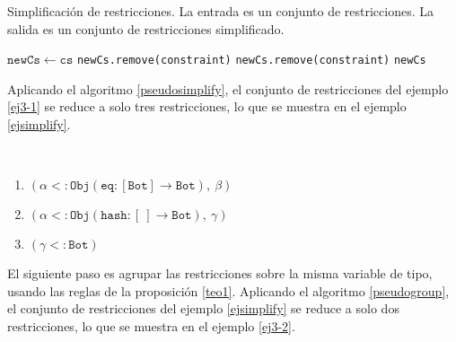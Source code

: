 \begin{algorithm}\captionsetup{labelsep=newline}
  \centering
  \caption{Simplificación de restricciones. La entrada es un conjunto de restricciones. La salida es un conjunto de restricciones simplificado.}
  \label{pseudosimplify}
    \begin{algorithmic}[1]
          \State $\mathtt{newCs\gets cs}$
              \State \texttt{newCs.remove(constraint)}
              \State \texttt{newCs.remove(constraint)}
            \EndIf
          \EndFor
          \State \Return \texttt{newCs}
      \EndFunction
    \end{algorithmic}
\end{algorithm}

Aplicando el algoritmo \ref{pseudosimplify}, el conjunto de restricciones del ejemplo \ref{ej3-1} se reduce a solo tres restricciones, lo que se muestra en el ejemplo \ref{ejsimplify}.

\begin{ej}\
  \normalfont
  \label{ejsimplify}
  \begin{enumerate}
    \item $\mathtt{(\alpha <: Obj(eq : [Bot] \rightarrow Bot),\ \beta)}$
    \item $\mathtt{(\alpha <: Obj(hash : [\ ] \rightarrow Bot),\ \gamma)}$
    \item $\mathtt{(\gamma <: Bot)}$
  \end{enumerate}
\end{ej}


El siguiente paso es agrupar las restricciones sobre la misma variable de tipo, usando las reglas de la proposición \ref{teo1}. Aplicando el algoritmo \ref{pseudogroup}, el conjunto de restricciones del ejemplo \ref{ejsimplify} se reduce a solo dos restricciones, lo que se muestra en el ejemplo \ref{ej3-2}.


